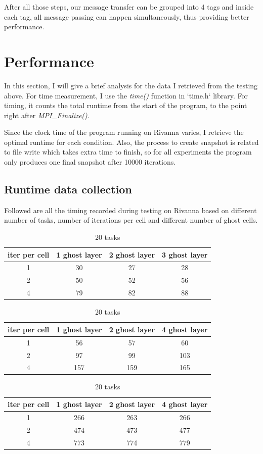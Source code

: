 \documentclass{cs4444}
\begin{document}
	After all those steps, our message transfer can be grouped into 4 tags and inside each tag, all message passing can happen simultaneously, thus providing better performance.
	
\section{Performance}
	In this section, I will give a brief analysis for the data I retrieved from the testing above. For time measurement, I use the \textit{time()} function in `time.h` library. For timing, it counts the total runtime from the start of the program, to the point right after \textit{MPI\_Finalize()}.
	 
	Since the clock time of the program running on Rivanna varies, I retrieve the optimal runtime for each condition. Also, the process to create snapshot is related to file write which takes extra time to finish, so for all experiments the program only produces one final snapshot after 10000 iterations.

\subsection{Runtime data collection}
	Followed are all the timing recorded during testing on Rivanna based on different number of tasks, number of iterations per cell and different number of ghost cells.
	
\begin{center}
\begin{table}[ht]
\caption{200 tasks}
\centering
\begin{tabular}{c c c c}
\hline\hline
iter per cell & 1 ghost layer & 2 ghost layer & 3 ghost layer \\
\hline
1&30&27	&28 \\
2&50&52	&56 \\
4&79&82	&88 \\
\hline
\end{tabular}
\caption{100 tasks}
\centering
\begin{tabular}{c c c c}
\hline\hline
iter per cell & 1 ghost layer & 2 ghost layer & 4 ghost layer \\
\hline
1&56&57&60 \\
2&97&99&103\\
4&157&159&165\\
\hline
\end{tabular}
\caption{20 tasks}
\centering
\begin{tabular}{c c c c}
\hline\hline
iter per cell & 1 ghost layer & 2 ghost layer & 4 ghost layer \\
\hline 
1&266&263&266 \\
2&474&473&477 \\
4&773&774&779 \\
\hline
\end{tabular}
\end{table}
\end{center}
\end{document}
